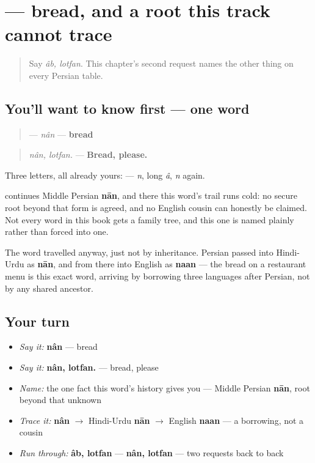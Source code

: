 \section[\texorpdfstring{\fa{نان} (nân)}{نان (nân)}]{ — bread, and a root this track cannot trace}

\label{lesson:FA-C09-nan}



\begin{quote}
Say \emph{âb, lotfan}. This chapter's second request names the other thing on every Persian table.
\end{quote}

\subsection*{You'll want to know first — one word}
\begin{quote}
\textbf{} — \emph{nân} — \textbf{bread}
\end{quote}

\begin{quote}
\emph{nân, lotfan.} — \textbf{Bread, please.}
\end{quote}

Three letters, all already yours: \textbf{  } — \emph{n}, long \emph{â}, \emph{n} again.

\begin{cousinweb}
\textbf{} continues Middle Persian \textbf{nān}, and there this word's trail runs cold: no secure root beyond that form is agreed, and no English cousin can honestly be claimed. Not every word in this book gets a family tree, and this one is named plainly rather than forced into one.

The word travelled anyway, just not by inheritance. Persian \textbf{} passed into Hindi-Urdu as \textbf{nān}, and from there into English as \textbf{naan} — the bread on a restaurant menu is this exact word, arriving by borrowing three languages after Persian, not by any shared ancestor.
\end{cousinweb}

\subsection*{Your turn}
\begin{itemize}
\raggedright
  \item \emph{Say it:} \textbf{nân} — bread
  \item \emph{Say it:} \textbf{nân, lotfan.} — bread, please
  \item \emph{Name:} the one fact this word's history gives you — Middle Persian \textbf{nān}, root beyond that unknown
  \item \emph{Trace it:} \textbf{nân} $\to$ Hindi-Urdu \textbf{nān} $\to$ English \textbf{naan} — a borrowing, not a cousin
  \item \emph{Run through:} \textbf{âb, lotfan} — \textbf{nân, lotfan} — two requests back to back
\end{itemize}

